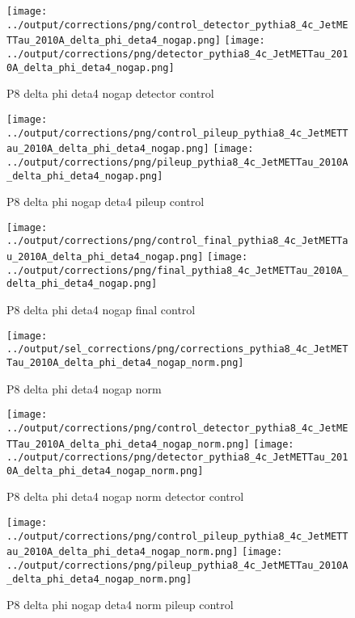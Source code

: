 \documentclass[11pt]{book}
\begin{document}
\begin{figure}[ht]
\centering
\texttt{[image: ../output/corrections/png/control\_detector\_pythia8\_4c\_JetMETTau\_2010A\_delta\_phi\_deta4\_nogap.png]}
\texttt{[image: ../output/corrections/png/detector\_pythia8\_4c\_JetMETTau\_2010A\_delta\_phi\_deta4\_nogap.png]}
\caption{P8 delta phi deta4 nogap detector control}
\label{fig:p8_JetMETTau_2010A_delta_phi_deta4_nogap_detector_control}
\end{figure}

\begin{figure}[ht]
\centering
\texttt{[image: ../output/corrections/png/control\_pileup\_pythia8\_4c\_JetMETTau\_2010A\_delta\_phi\_deta4\_nogap.png]}
\texttt{[image: ../output/corrections/png/pileup\_pythia8\_4c\_JetMETTau\_2010A\_delta\_phi\_deta4\_nogap.png]}
\caption{P8 delta phi nogap deta4 pileup control}
\label{fig:p8_JetMETTau_2010A_delta_phi_deta4_nogap_pileup_control}
\end{figure}


\begin{figure}[ht]
\centering
\texttt{[image: ../output/corrections/png/control\_final\_pythia8\_4c\_JetMETTau\_2010A\_delta\_phi\_deta4\_nogap.png]}
\texttt{[image: ../output/corrections/png/final\_pythia8\_4c\_JetMETTau\_2010A\_delta\_phi\_deta4\_nogap.png]}
\caption{P8 delta phi deta4 nogap final control}
\label{fig:p8_JetMETTau_2010A_delta_phi_deta4_nogap_final_control}
\end{figure}

\begin{figure}[ht]
\centering
\texttt{[image: ../output/sel\_corrections/png/corrections\_pythia8\_4c\_JetMETTau\_2010A\_delta\_phi\_deta4\_nogap\_norm.png]}
\caption{P8 delta phi deta4 nogap norm}
\label{fig:p8_JetMETTau_2010A_delta_phi_deta4_nogap_norm}
\end{figure}

\begin{figure}[ht]
\centering
\texttt{[image: ../output/corrections/png/control\_detector\_pythia8\_4c\_JetMETTau\_2010A\_delta\_phi\_deta4\_nogap\_norm.png]}
\texttt{[image: ../output/corrections/png/detector\_pythia8\_4c\_JetMETTau\_2010A\_delta\_phi\_deta4\_nogap\_norm.png]}
\caption{P8 delta phi deta4 nogap norm detector control}
\label{fig:p8_JetMETTau_2010A_delta_phi_deta4_nogap_norm_detector_control}
\end{figure}

\begin{figure}[ht]
\centering
\texttt{[image: ../output/corrections/png/control\_pileup\_pythia8\_4c\_JetMETTau\_2010A\_delta\_phi\_deta4\_nogap\_norm.png]}
\texttt{[image: ../output/corrections/png/pileup\_pythia8\_4c\_JetMETTau\_2010A\_delta\_phi\_deta4\_nogap\_norm.png]}
\caption{P8 delta phi nogap deta4 norm pileup control}
\label{fig:p8_JetMETTau_2010A_delta_phi_deta4_nogap_norm_pileup_control}
\end{figure}
\end{document}
